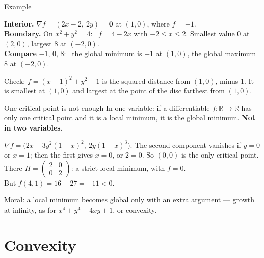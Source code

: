\documentclass[10pt]{wosm-slides}
\newcommand{\R}{\mathbb{R}}
\begin{document}
\begin{frame}{Example}
  \begin{example}[$f(x, y) = x^2 + y^2 - 2x$ on the disc $x^2 + y^2 \le 4$]
    \textbf{Interior.} $\nabla f = (2x - 2, \ 2y) = \mathbf 0$ at $(1, 0)$, where $f = -1$.
    \pause\\[0.3em]
    \textbf{Boundary.} On $x^2 + y^2 = 4$: \ $f = 4 - 2x$ with $-2 \le x \le 2$. Smallest value $0$ at
    $(2, 0)$, largest $8$ at $(-2, 0)$.
    \pause\\[0.3em]
    \textbf{Compare} $-1$, $0$, $8$: \ the global minimum is $-1$ at $(1, 0)$, the global maximum
    $8$ at $(-2, 0)$.
  \end{example}
  \pause
  {\small Check: $f = (x - 1)^2 + y^2 - 1$ is the squared distance from $(1, 0)$, minus $1$. It is
  smallest at $(1, 0)$ and largest at the point of the disc farthest from $(1, 0)$.\par}
\end{frame}

\begin{frame}{One critical point is not enough}
  In one variable: if a differentiable $f\colon \R \to \R$ has only one critical point and it is a
  local minimum, it is the global minimum. \textbf{Not in two variables.}
  \pause
  \begin{example}[$f(x, y) = x^2 + y^2 (1 - x)^3$]
    $\nabla f = \bigl(2x - 3y^2(1 - x)^2, \ 2y(1 - x)^3\bigr)$. The second component vanishes if
    $y = 0$ or $x = 1$; then the first gives $x = 0$, or $2 = 0$. So $(0, 0)$ is the only
    critical point.
    \pause\\[0.3em]
    There $H = \begin{pmatrix} 2 & 0 \\ 0 & 2 \end{pmatrix}$: a strict local minimum, with $f = 0$.
    \pause\\[0.3em]
    But $f(4, 1) = 16 - 27 = -11 < 0$.
  \end{example}
  {\small Moral: a local minimum becomes global only with an extra argument --- growth at infinity,
  as for $x^4 + y^4 - 4xy + 1$, or convexity.\par}
\end{frame}

\section{Convexity}
\end{document}
